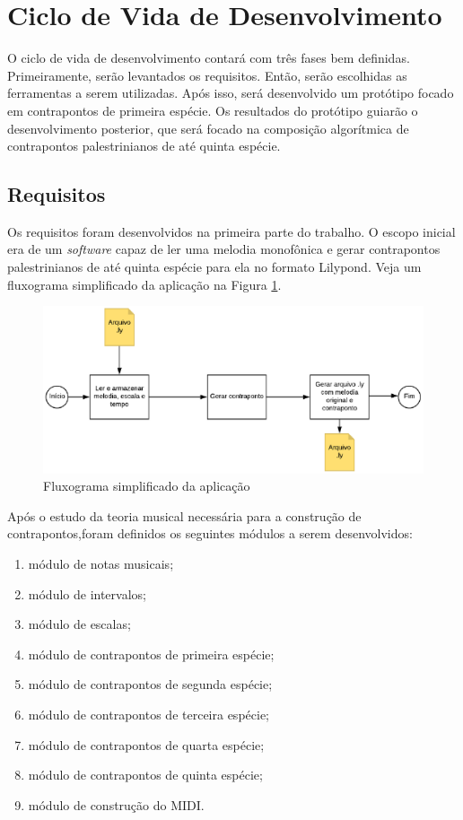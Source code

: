   \section[Ciclo de Vida de Desenvolvimento]{Ciclo de Vida de Desenvolvimento}

    O ciclo de vida de desenvolvimento contará com três fases bem definidas. Primeiramente, serão levantados os requisitos. Então, serão escolhidas as ferramentas a serem utilizadas. Após isso, será desenvolvido um protótipo focado em contrapontos de primeira espécie. Os resultados do protótipo guiarão o desenvolvimento posterior, que será focado na composição algorítmica de contrapontos palestrinianos de até quinta espécie.

  \subsection[Requisitos]{Requisitos} \label{sssec:req}

    Os requisitos foram desenvolvidos na primeira parte do trabalho. O escopo inicial era de um \textit{software} capaz de ler uma melodia monofônica e gerar contrapontos palestrinianos de até quinta espécie para ela no formato Lilypond. Veja um fluxograma simplificado da aplicação na Figura \ref{fluxograma}.

    \begin{figure}[htb]
      \centering
      \includegraphics[scale=1]{figuras/fluxograma.eps}
      \caption{Fluxograma simplificado da aplicação}
      \label{fluxograma}
    \end{figure}


    Após o estudo da teoria musical necessária para a construção de contrapontos,foram definidos os seguintes módulos a serem desenvolvidos:

    \begin{enumerate}
      \item módulo de notas musicais;
      \item módulo de intervalos;
      \item módulo de escalas;
      \item módulo de contrapontos de primeira espécie;
      \item módulo de contrapontos de segunda espécie;
      \item módulo de contrapontos de terceira espécie;
      \item módulo de contrapontos de quarta espécie;
      \item módulo de contrapontos de quinta espécie;
      \item módulo de construção do MIDI.
    \end{enumerate}

